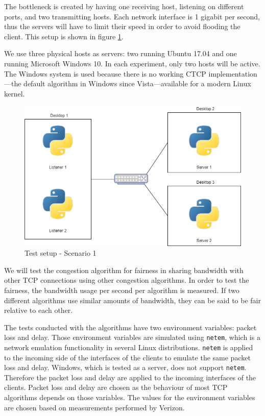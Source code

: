 \documentclass{article}
\begin{document}
The bottleneck is created by having one receiving host, listening on different
ports, and two transmitting hosts. Each network interface is 1 gigabit per
second, thus the servers will have to limit their speed in order to avoid
flooding the client. This setup is shown in figure \ref{fig:setup1}.

We use three physical hosts as servers: two running Ubuntu 17.04 and one
running Microsoft Windows 10. In each experiment, only two hosts will be active.
The Windows system is used because there is no working CTCP
implementation---the default algorithm in Windows since Vista---available for a
modern Linux kernel.

\begin{figure}[H]
	\centering
		\includegraphics[scale=0.5]{figs/setup2.png}
		\caption{Test setup - Scenario 1}
	\label{fig:setup1}
\end{figure}

We will test the congestion algorithm for fairness in sharing bandwidth
with other TCP connections using other congestion algorithms. In order to test
the fairness, the bandwidth usage per second per algorithm is measured. If two
different algorithms use similar amounts of bandwidth, they can be said to be
fair relative to each other.

The tests conducted with the algorithms have two environment variables: packet loss and delay. Those environment variables are simulated using \texttt{netem}, which is a network emulation functionality in several Linux distributions\cite{linux-netem}. \texttt{netem} is applied to the incoming side of the interfaces of the clients to emulate the same packet loss and delay. Windows, which is tested as a server, does not support \texttt{netem}. Therefore the packet loss and delay are applied to the incoming interfaces of the clients. Packet loss and delay are chosen as the behaviour of most TCP algorithms depends on those variables\cite{bbr-congestion}\cite{dctcp-congestion}\cite{cubic-tcp-congestion}\cite{compound-tcp-congestion}\cite{bic-tcp-congestion}. The values for the environment variables are chosen based on measurements performed by Verizon\cite{verizon-latency}.
\end{document}
